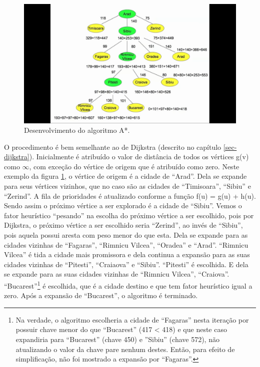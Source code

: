 \begin{figure}[H]
\centering
\includegraphics[width=.85\textwidth]{figuras/Aestrela-mapa2} 
\caption{Desenvolvimento do algoritmo A*.}
\label{fig-aestrela-algoritmo-mapa2}
\end{figure}

O procedimento é bem semelhante ao de Dijkstra (descrito no capítulo \ref{sec-dijkstra}). Inicialmente é atribuído o valor de distância de todos os vértices g(v) como $\infty$, com exceção do vértice de origem que é atribuído como zero. Neste exemplo da figura \ref{fig-aestrela-algoritmo-mapa2}, o vértice de origem é a cidade de ``Arad''. Dela se expande para seus vértices vizinhos, que no caso são as cidades de ``Timisoara'', ``Sibiu'' e ``Zerind''. A fila de prioridades é atualizado conforme a função f(u) = g(u) + h(u). Sendo assim o próximo vértice a ser explorado é a cidade de ``Sibiu''. Vemos o fator heurístico ``pesando'' na escolha do próximo vértice a ser escolhido, pois por Dijkstra, o próximo vértice a ser escolhido seria ``Zerind'', ao invés de ``Sibiu'', pois aquela possui aresta com peso menor do que esta. Dela se expande para as cidades vizinhas de ``Fagaras'', ``Rimnicu Vilcea'', ``Oradea'' e ``Arad''. ``Rimnicu Vilcea'' é tida a cidade mais promissora e dela continua a expansão para as suas cidades vizinhas de ``Pitesti'', ``Craiaova'' e ``Sibiu''. ``Pitesti'' é escolhida. E dela se expande para as suas cidades vizinhas de ``Rimnicu Vilcea'', ``Craiova''. ``Bucarest''\footnote{Na verdade, o algoritmo escolheria a cidade de ``Fagaras'' nesta iteração por possuir chave menor do que ``Bucarest'' (417 < 418) e que neste caso expandiria para ``Bucarest'' (chave 450) e ''Sibiu'' (chave 572), não atualizando o valor da chave pare nenhum destes. Então, para efeito de simplificação, não foi mostrado a expansão por ``Fagaras''.} é escolhida, que é a cidade destino e que tem fator heurístico igual a zero. Após a expansão de ``Bucarest'', o algoritmo é terminado.


